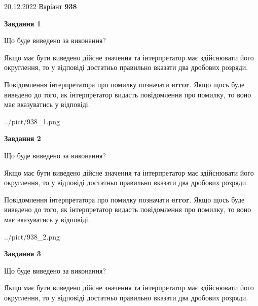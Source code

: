 \documentclass[12pt, ukrainian]{article}
\begin{document}
{20.12.2022 Варіант \No \textbf { 938 }\par}
{
\begin {Large}

{\begin {center}\textbf{Завдання 1}\end {center}}\par
Що буде виведено за виконання? \par

Якщо має бути виведено дійсне значення та інтерпретатор має здійснювати його округлення, 
то у відповіді достатньо правильно вказати два дробових розряди.

Повідомлення інтерпретатора про помилку позначати \textbf{error}.
Якщо щось буде виведено до того, як інтерпретатор видасть повідомлення про помилку, 
то воно має вказуватись у відповіді. \par

\begin{center}
	{../pict/938_1.png}
\end{center}
\newpage

{\begin {center}\textbf{Завдання 2}\end {center}}\par
Що буде виведено за виконання? \par

Якщо має бути виведено дійсне значення та інтерпретатор має здійснювати його округлення, 
то у відповіді достатньо правильно вказати два дробових розряди.

Повідомлення інтерпретатора про помилку позначати \textbf{error}.
Якщо щось буде виведено до того, як інтерпретатор видасть повідомлення про помилку, 
то воно має вказуватись у відповіді. \par

\begin{center}
	{../pict/938_2.png}
\end{center}
\newpage

{\begin {center}\textbf{Завдання 3}\end {center}}\par
Що буде виведено за виконання? \par

Якщо має бути виведено дійсне значення та інтерпретатор має здійснювати його округлення, 
то у відповіді достатньо правильно вказати два дробових розряди.


\end{Large}}
\end{document}
